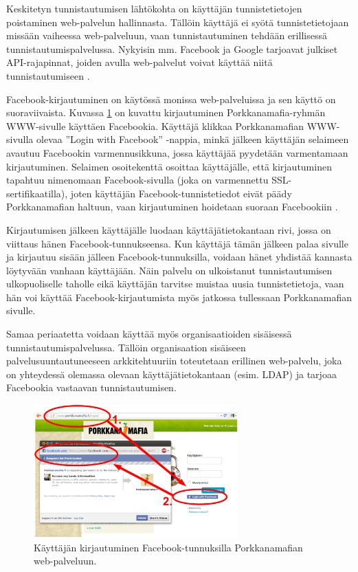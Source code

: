 Keskitetyn tunnistautumisen lähtökohta on käyttäjän tunnistetietojen poistaminen web-palvelun hallinnasta. Tällöin käyttäjä ei syötä tunnistetietojaan missään vaiheessa web-palveluun, vaan tunnistautuminen tehdään erillisessä tunnistautumispalvelussa. Nykyisin mm. Facebook ja Google tarjoavat julkiset API-rajapinnat, joiden avulla web-palvelut voivat käyttää niitä tunnistautumiseen \cite{facebook}.

Facebook-kirjautuminen on käytössä monissa web-palveluissa ja sen käyttö on suoraviivaista. Kuvassa \ref{facebook_login} on kuvattu kirjautuminen Porkkanamafia-ryhmän WWW-sivulle käyttäen Facebookia. Käyttäjä klikkaa Porkkanamafian WWW-sivulla olevaa ''Login with Facebook'' -nappia, minkä jälkeen käyttäjän selaimeen avautuu Facebookin varmennusikkuna, jossa käyttäjää pyydetään varmentamaan kirjautuminen. Selaimen osoitekenttä osoittaa käyttäjälle, että kirjautuminen tapahtuu nimenomaan Facebook-sivulla (joka on varmennettu SSL-sertifikaatilla), joten käyttäjän Facebook-tun\-nis\-te\-tie\-dot eivät päädy Porkkanamafian haltuun, vaan kirjautuminen hoidetaan suoraan Facebookiin \cite{facebook}.

Kirjautumisen jälkeen käyttäjälle luodaan käyttäjätietokantaan rivi, jossa on viittaus hänen Facebook-tunnukseensa. Kun käyttäjä tämän jälkeen palaa sivulle ja kirjautuu sisään jälleen Facebook-tunnuksilla, voidaan hänet yhdistää kannasta löytyvään vanhaan käyttäjään. Näin palvelu on ulkoistanut tunnistautumisen ulkopuoliselle taholle eikä käyttäjän tarvitse muistaa uusia tunnistetietoja, vaan hän voi käyttää Facebook-kirjautumista myös jatkossa tullessaan Porkkanamafian sivulle.

Samaa periaatetta voidaan käyttää myös organisaatioiden sisäisessä tunnistautumispalvelussa. Tällöin organisaation sisäiseen palvelusuuntautuneeseen arkkitehtuuriin toteutetaan erillinen web-palvelu, joka on yhteydessä olemassa olevaan käyttäjätietokantaan (esim. LDAP) ja tarjoaa Facebookia vastaavan tunnistautumisen.

\begin{figure}[ht]
\centering
\includegraphics[width=0.7\textwidth]{teknologiat/facebook.eps}
\caption{Käyttäjän kirjautuminen Facebook-tunnuksilla Porkkanamafian web-palveluun.}%
\label{facebook_login}
\end{figure}